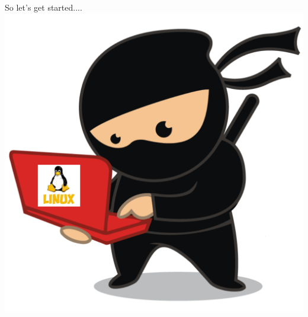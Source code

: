 \begin{flushleft}
\begin{multicols}{2}
		\vfill \null
		\columnbreak
		So let's get started....
		\includegraphics[scale=0.08]{content/linux_section.png}
	\end{multicols}	
	
\end{flushleft}

\newpage


